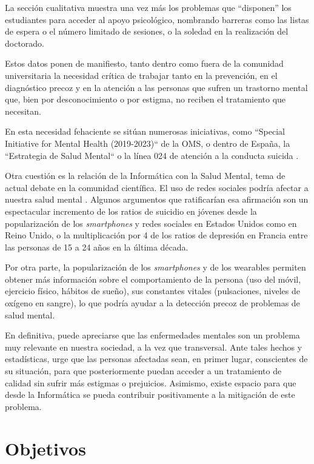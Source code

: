     La sección cualitativa muestra una vez más los problemas que ``disponen'' los estudiantes para acceder al apoyo psicológico, nombrando barreras como las listas de espera o el número limitado de sesiones, o la soledad en la realización del doctorado.
    
    Estos datos ponen de manifiesto, tanto dentro como fuera de la comunidad universitaria la necesidad crítica de trabajar tanto en la prevención, en el diagnóstico precoz y en la atención a las personas que sufren un trastorno mental que, bien por desconocimiento o por estigma, no reciben el tratamiento que necesitan.
    
    En esta necesidad fehaciente se sitúan numerosas iniciativas, como ``Special Initiative for Mental Health (2019-2023)`` \cite{oms_salud_nodate} de la OMS, o dentro de España, la ``Estrategia de Salud Mental`` o la línea 024 de atención a la conducta suicida \cite{la_moncloa_minones_2023}.

    Otra cuestión es la relación de la Informática con la Salud Mental, tema de actual debate en la comunidad científica. El uso de redes sociales podría afectar a nuestra salud mental \cite{burn-murdoch_smartphones_2023}. Algunos argumentos que ratificarían esa afirmación son un espectacular incremento de los ratios de suicidio en jóvenes desde la popularización de los \textit{smartphones} y redes sociales en Estados Unidos como en Reino Unido, o la multiplicación por 4 de los ratios de depresión en Francia entre las personas de 15 a 24 años en la última década.
    
    Por otra parte, la popularización de los \textit{smartphones} y de los \glspl{wearable} permiten obtener más información sobre el comportamiento de la persona (uso del móvil, ejercicio físico, hábitos de sueño), sus constantes vitales (pulsaciones, niveles de oxígeno en sangre), lo que podría ayudar a la detección precoz de problemas de salud mental.
    
    En definitiva, puede apreciarse que las enfermedades mentales son un problema muy relevante en nuestra sociedad, a la vez que transversal. Ante tales hechos y estadísticas, urge que las personas afectadas sean, en primer lugar, conscientes de su situación, para que posteriormente puedan acceder a un tratamiento de calidad sin sufrir más estigmas o prejuicios. Asimismo, existe espacio para que desde la Informática se pueda contribuir positivamente a la mitigación de este problema.
    
\section{Objetivos}
    \label{sec:objetivos}

